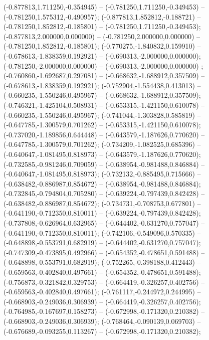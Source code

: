  (-0.877813,1.711250,-0.354945) -- (-0.781250,1.711250,-0.349453) -- (-0.781250,1.575312,-0.490957);
 (-0.877813,1.852812,-0.188721) -- (-0.781250,1.852812,-0.185801) -- (-0.781250,1.711250,-0.349453);
 (-0.877813,2.000000,0.000000) -- (-0.781250,2.000000,0.000000) -- (-0.781250,1.852812,-0.185801);
 (-0.770275,-1.840832,0.159910) -- (-0.678613,-1.838359,0.192921) -- (-0.690313,-2.000000,0.000000);
 (-0.781250,-2.000000,0.000000) -- (-0.690313,-2.000000,0.000000) ;
 (-0.760860,-1.692687,0.297081) -- (-0.668632,-1.688912,0.357509) -- (-0.678613,-1.838359,0.192921);
 (-0.752904,-1.554438,0.413013) -- (-0.660235,-1.550246,0.495967) -- (-0.668632,-1.688912,0.357509);
 (-0.746321,-1.425104,0.508931) -- (-0.653315,-1.421150,0.610078) -- (-0.660235,-1.550246,0.495967);
 (-0.741044,-1.303828,0.585819) -- (-0.647785,-1.300579,0.701262) -- (-0.653315,-1.421150,0.610078);
 (-0.737020,-1.189856,0.644448) -- (-0.643579,-1.187626,0.770620) -- (-0.647785,-1.300579,0.701262);
 (-0.734209,-1.082525,0.685396) -- (-0.640647,-1.081495,0.818973) -- (-0.643579,-1.187626,0.770620);
 (-0.732585,-0.981246,0.709059) -- (-0.638954,-0.981488,0.846884) -- (-0.640647,-1.081495,0.818973);
 (-0.732132,-0.885495,0.715666) -- (-0.638482,-0.886987,0.854672) -- (-0.638954,-0.981488,0.846884);
 (-0.732845,-0.794804,0.705280) -- (-0.639224,-0.797439,0.842428) -- (-0.638482,-0.886987,0.854672);
 (-0.734731,-0.708753,0.677801) -- (-0.641190,-0.712350,0.810011) -- (-0.639224,-0.797439,0.842428);
 (-0.737808,-0.626964,0.632965) -- (-0.644402,-0.631270,0.757047) -- (-0.641190,-0.712350,0.810011);
 (-0.742106,-0.549096,0.570335) -- (-0.648898,-0.553791,0.682919) -- (-0.644402,-0.631270,0.757047);
 (-0.747309,-0.473895,0.492966) -- (-0.654352,-0.478651,0.591488) -- (-0.648898,-0.553791,0.682919);
 (-0.752265,-0.398188,0.412443) -- (-0.659563,-0.402840,0.497661) -- (-0.654352,-0.478651,0.591488);
 (-0.756873,-0.321842,0.329753) -- (-0.664419,-0.326257,0.402756) -- (-0.659563,-0.402840,0.497661);
 (-0.761117,-0.244972,0.244995) -- (-0.668903,-0.249036,0.306939) -- (-0.664419,-0.326257,0.402756);
 (-0.764985,-0.167697,0.158273) -- (-0.672998,-0.171320,0.210382) -- (-0.668903,-0.249036,0.306939);
 (-0.768464,-0.090139,0.069703) -- (-0.676689,-0.093255,0.113267) -- (-0.672998,-0.171320,0.210382);
